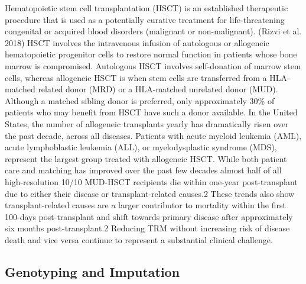 \documentclass[]{DissertateUSU}
\begin{document}
Hematopoietic stem cell transplantation (HSCT) is an established
therapeutic procedure that is used as a potentially curative treatment
for life-threatening congenital or acquired blood disorders (malignant
or non-malignant). (Rizvi et al. 2018) HSCT involves the intravenous
infusion of autologous or allogeneic hematopoietic progenitor cells to
restore normal function in patients whose bone marrow is compromised.
Autologous HSCT involves self-donation of marrow stem cells, whereas
allogeneic HSCT is when stem cells are transferred from a HLA-matched
related donor (MRD) or a HLA-matched unrelated donor (MUD). Although a
matched sibling donor is preferred, only approximately 30\% of patients
who may benefit from HSCT have such a donor available. In the United
States, the number of allogeneic transplants yearly has dramatically
risen over the past decade, across all diseases. Patients with acute
myeloid leukemia (AML), acute lymphoblastic leukemia (ALL), or
myelodysplastic syndrome (MDS), represent the largest group treated with
allogeneic HSCT. While both patient care and matching has improved over
the past few decades almost half of all high-resolution 10/10 MUD-HSCT
recipients die within one-year post-transplant due to either their
disease or transplant-related causes.2 These trends also show
transplant-related causes are a larger contributor to mortality within
the first 100-days post-transplant and shift towards primary disease
after approximately six months post-transplant.2 Reducing TRM without
increasing risk of disease death and vice versa continue to represent a
substantial clinical challenge.

\subsection{Genotyping and Imputation}\label{genotyping-and-imputation}
\end{document}
